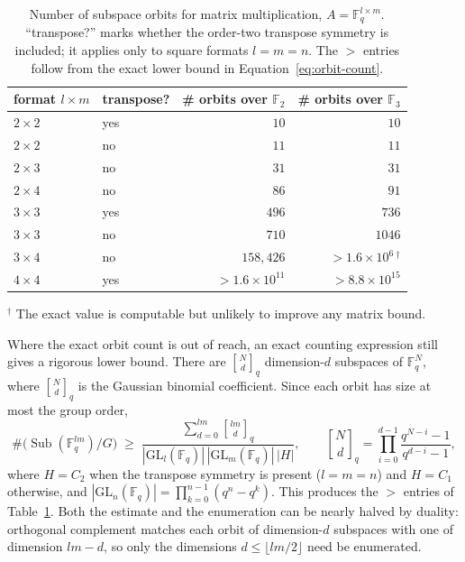 \documentclass[11pt]{article}
\theoremstyle{definition}
\newcommand{\F}{\mathbb{F}}
\newcommand{\GL}{\mathrm{GL}}
\begin{document}
\begin{table}[!ht]
  \centering
  \setlength{\tabcolsep}{12pt}
  \begin{tabular}{llrr}
    \toprule
    format $l\times m$ & transpose? & \# orbits over $\F_2$ & \# orbits over $\F_3$          \\
    \midrule
    $2\times 2$        & yes        & $10$                  & $10$                           \\
    $2\times 2$        & no         & $11$                  & $11$                           \\
    $2\times 3$        & no         & $31$                  & $31$                           \\
    $2\times 4$        & no         & $86$                  & $91$                           \\
    $3\times 3$        & yes        & $496$                 & $736$                          \\
    $3\times 3$        & no         & $710$                 & $1046$                         \\
    $3\times 4$        & no         & $158{,}426$           & ${>}1.6\times10^{6}\,^\dagger$ \\
    $4\times 4$        & yes        & ${>}1.6\times10^{11}$ & ${>}8.8\times10^{15}$          \\
    \bottomrule
  \end{tabular}

  \smallskip
  {\footnotesize\raggedright
    $^\dagger$ The exact value is computable but unlikely to improve any matrix
  bound.\par}
  \caption{Number of subspace orbits for matrix multiplication,
    $A=\F_q^{l\times m}$. ``transpose?'' marks whether the order-two transpose
    symmetry is included; it applies only to square formats $l=m=n$. The ${>}$
  entries follow from the exact lower bound in Equation~\eqref{eq:orbit-count}.}
  \label{tab:orbits}
\end{table}

Where the exact orbit count is out of reach, an exact counting expression still
gives a rigorous lower bound. There are
$\genfrac{[}{]}{0pt}{}{N}{d}_q$ dimension-$d$ subspaces of $\F_q^N$, where
$\genfrac{[}{]}{0pt}{}{N}{d}_q$ is the Gaussian binomial coefficient. Since
each orbit has size at most the group order,
\begin{equation}\label{eq:orbit-count}
  \#\bigl(\operatorname{Sub}(\F_q^{lm})/G\bigr)
  \;\ge\;
  \frac{\displaystyle\sum_{d=0}^{lm}\genfrac{[}{]}{0pt}{}{lm}{d}_q}
  {|\GL_l(\F_q)|\,|\GL_m(\F_q)|\,|H|}
  ,
  \qquad
  \genfrac{[}{]}{0pt}{}{N}{d}_q
  =\prod_{i=0}^{d-1}\frac{q^{N-i}-1}{q^{d-i}-1},
\end{equation}
where $H=C_2$ when the transpose symmetry is present ($l=m=n$) and $H=C_1$
otherwise, and $|\GL_n(\F_q)|=\prod_{k=0}^{n-1}(q^n-q^k)$.
This produces the
${>}$ entries of Table~\ref{tab:orbits}. Both the estimate and the
enumeration can be nearly halved by duality: orthogonal
complement matches each orbit of dimension-$d$ subspaces with one of dimension
$lm-d$, so only the
dimensions $d\le\lfloor lm/2\rfloor$ need be enumerated.
\end{document}
